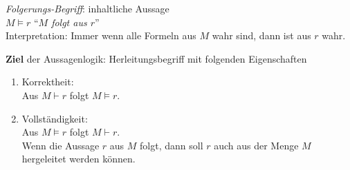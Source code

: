 \documentclass{article}
\begin{document}
\emph{Folgerungs-Begriff}: inhaltliche Aussage
\\[0.3cm]
\hspace*{1.3cm} $M \models r$ \qquad ``\emph{$M$ folgt aus $r$}'' 
\\[0.3cm]
Interpretation: Immer wenn alle Formeln aus $M$ wahr sind, dann ist aus $r$ wahr.
\vspace*{0.3cm}

\noindent
\textbf{Ziel} der Aussagenlogik: Herleitungsbegriff mit folgenden Eigenschaften
\begin{enumerate}
\item Korrektheit: \\[0.3cm]
      \hspace*{1.3cm} Aus $M \vdash r$ folgt $M \models r$. 
\item Vollst\"{a}ndigkeit: \\[0.3cm]
      \hspace*{1.3cm} Aus $M \models r$ folgt $M \vdash r$. 
      \\[0.1cm]
      Wenn die Aussage $r$ aus $M$ folgt, dann soll $r$ auch aus der Menge $M$
      hergeleitet werden k\"{o}nnen.
\end{enumerate}
\vspace*{0.3cm}
\end{document}
